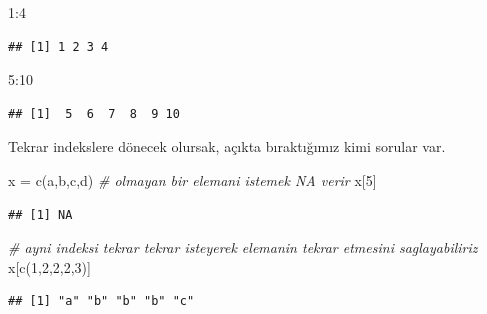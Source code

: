 \documentclass[
]{book}
\newenvironment{Shaded}{\begin{snugshade}}{\end{snugshade}}
\newcommand{\CommentTok}[1]{\textcolor[rgb]{0.56,0.35,0.01}{\textit{#1}}}
\newcommand{\DecValTok}[1]{\textcolor[rgb]{0.00,0.00,0.81}{#1}}
\newcommand{\FunctionTok}[1]{\textcolor[rgb]{0.00,0.00,0.00}{#1}}
\newcommand{\NormalTok}[1]{#1}
\newcommand{\OtherTok}[1]{\textcolor[rgb]{0.56,0.35,0.01}{#1}}
\newcommand{\SpecialCharTok}[1]{\textcolor[rgb]{0.00,0.00,0.00}{#1}}
\newcommand{\StringTok}[1]{\textcolor[rgb]{0.31,0.60,0.02}{#1}}
\begin{document}
\begin{Shaded}
\begin{Highlighting}[]
\DecValTok{1}\SpecialCharTok{:}\DecValTok{4}
\end{Highlighting}
\end{Shaded}

\begin{verbatim}
## [1] 1 2 3 4
\end{verbatim}

\begin{Shaded}
\begin{Highlighting}[]
\DecValTok{5}\SpecialCharTok{:}\DecValTok{10}
\end{Highlighting}
\end{Shaded}

\begin{verbatim}
## [1]  5  6  7  8  9 10
\end{verbatim}

Tekrar indekslere dönecek olursak, açıkta bıraktığımız kimi sorular var.

\begin{Shaded}
\begin{Highlighting}[]
\NormalTok{x }\OtherTok{=} \FunctionTok{c}\NormalTok{(}\StringTok{\textquotesingle{}a\textquotesingle{}}\NormalTok{,}\StringTok{\textquotesingle{}b\textquotesingle{}}\NormalTok{,}\StringTok{\textquotesingle{}c\textquotesingle{}}\NormalTok{,}\StringTok{\textquotesingle{}d\textquotesingle{}}\NormalTok{)}
\CommentTok{\# olmayan bir elemani istemek NA verir}
\NormalTok{x[}\DecValTok{5}\NormalTok{]}
\end{Highlighting}
\end{Shaded}

\begin{verbatim}
## [1] NA
\end{verbatim}

\begin{Shaded}
\begin{Highlighting}[]
\CommentTok{\# ayni indeksi tekrar tekrar isteyerek elemanin tekrar etmesini saglayabiliriz}
\NormalTok{x[}\FunctionTok{c}\NormalTok{(}\DecValTok{1}\NormalTok{,}\DecValTok{2}\NormalTok{,}\DecValTok{2}\NormalTok{,}\DecValTok{2}\NormalTok{,}\DecValTok{3}\NormalTok{)]}
\end{Highlighting}
\end{Shaded}

\begin{verbatim}
## [1] "a" "b" "b" "b" "c"
\end{verbatim}
\end{document}
